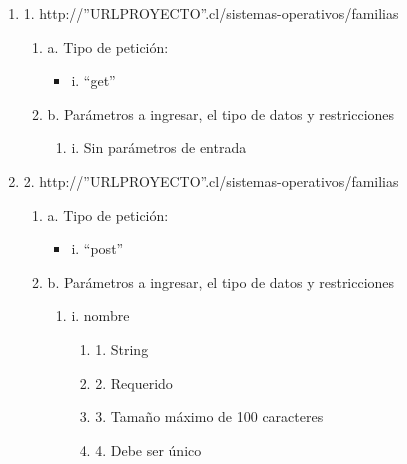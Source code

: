 \begin{enumerate}
    \item 1. http://”URLPROYECTO”.cl/sistemas-operativos/familias
    \begin{enumerate}
        \item a. Tipo de petición:
            \begin{itemize}
               \item i. “get”
            \end{itemize}
        \item b. Parámetros a ingresar, el tipo de datos y restricciones
            \begin{enumerate}
                \item i. Sin parámetros de entrada
            \end{enumerate}
    \end{enumerate}

    \item 2. http://”URLPROYECTO”.cl/sistemas-operativos/familias
    \begin{enumerate}
        \item a. Tipo de petición:
            \begin{itemize}
               \item i. “post”
            \end{itemize}
        \item b. Parámetros a ingresar, el tipo de datos y restricciones
            \begin{enumerate}
                \item i. nombre
                    \begin{enumerate}
                        \item 1. String
                        \item 2. Requerido
                        \item 3. Tamaño máximo de 100 caracteres
                        \item 4. Debe ser único
                    \end{enumerate}
            \end{enumerate}
    \end{enumerate}


\end{enumerate}
